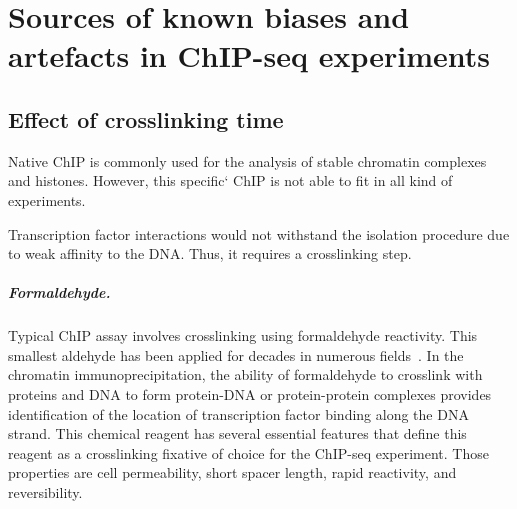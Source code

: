 \chapter{Sources of known biases and artefacts in ChIP-seq experiments}



\section{Effect of crosslinking time}
\label{formaldehyde}


Native ChIP is commonly used for the analysis of stable chromatin complexes~\cite{kasinathan2014high} and histones.
However, this specific` ChIP is not able to fit in all kind of experiments.

Transcription factor interactions would not withstand the isolation procedure due to weak affinity to the DNA.
Thus, it requires a crosslinking step.
\paragraph{Formaldehyde.}
Typical ChIP assay involves crosslinking using formaldehyde reactivity. 
This smallest aldehyde has been applied for decades in numerous fields~\cite{eckels2003formalin,werner2000effect,gavrilov2015vivo}.
In the chromatin immunoprecipitation, the ability of formaldehyde to crosslink with proteins and DNA to form protein-DNA or protein-protein complexes provides identification of the location of transcription factor binding along the DNA strand.
This chemical reagent has several essential features that define this reagent as a crosslinking fixative of choice for the ChIP-seq experiment. 
Those properties are cell permeability, short spacer length, rapid reactivity, and reversibility.

